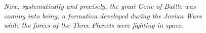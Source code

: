 \begin{figure}[htbp]
    \linethickness{2pt}
        \centering%
        \caption{\textit{Now, systematically and precisely, the great Cone of
        Battle was coming into being; a formation developed during
        the Jovian Wars while the forces of the Three Planets were
        fighting in space.}}
    \end{figure}
